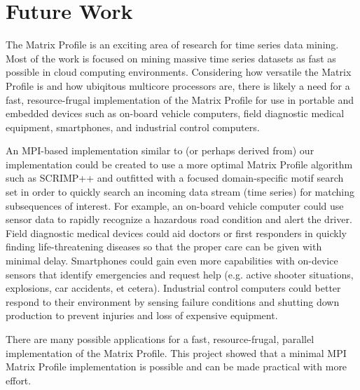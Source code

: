 \documentclass[conference]{IEEEtran}
\begin{document}
\section{Future Work}
The Matrix Profile is an exciting area of research for time series data mining.  Most of the work is focused on mining massive time series datasets as fast as possible in cloud computing environments.  Considering how versatile the Matrix Profile is and how ubiqitous multicore processors are, there is likely a need for a fast, resource-frugal implementation of the Matrix Profile for use in portable and embedded devices such as on-board vehicle computers, field diagnostic medical equipment, smartphones, and industrial control computers.  

An MPI-based implementation similar to (or perhaps derived from) our implementation could be created to use a more optimal Matrix Profile algorithm such as SCRIMP++ and outfitted with a focused domain-specific motif search set in order to quickly search an incoming data stream (time series) for matching subsequences of interest.  For example, an on-board vehicle computer could use sensor data to rapidly recognize a hazardous road condition and alert the driver.  Field diagnostic medical devices could aid doctors or first responders in quickly finding life-threatening diseases so that the proper care can be given with minimal delay.  Smartphones could gain even more capabilities with on-device sensors that identify emergencies and request help (e.g. active shooter situations, explosions, car accidents, et cetera).  Industrial control computers could better respond to their environment by sensing failure conditions and shutting down production to prevent injuries and loss of expensive equipment.  

There are many possible applications for a fast, resource-frugal, parallel implementation of the Matrix Profile.  This project showed that a minimal MPI Matrix Profile implementation is possible and can be made practical with more effort.


\end{document}
